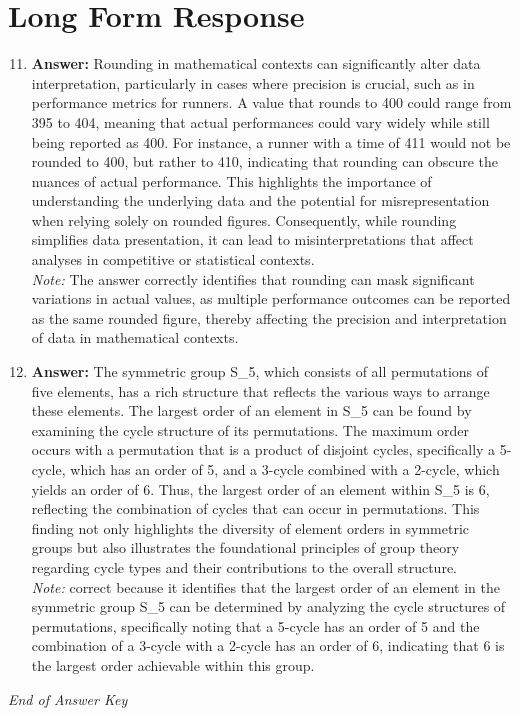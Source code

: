 \documentclass[12pt]{article}
\begin{document}
\section*{Long Form Response}
\begin{enumerate}[label=\arabic*.]
\setcounter{enumi}{10}
\item \textbf{Answer:} Rounding in mathematical contexts can significantly alter data interpretation, particularly in cases where precision is crucial, such as in performance metrics for runners. A value that rounds to 400 could range from 395 to 404, meaning that actual performances could vary widely while still being reported as 400. For instance, a runner with a time of 411 would not be rounded to 400, but rather to 410, indicating that rounding can obscure the nuances of actual performance. This highlights the importance of understanding the underlying data and the potential for misrepresentation when relying solely on rounded figures. Consequently, while rounding simplifies data presentation, it can lead to misinterpretations that affect analyses in competitive or statistical contexts.
\\ \textit{Note:} The answer correctly identifies that rounding can mask significant variations in actual values, as multiple performance outcomes can be reported as the same rounded figure, thereby affecting the precision and interpretation of data in mathematical contexts.
\item \textbf{Answer:} The symmetric group S\_5, which consists of all permutations of five elements, has a rich structure that reflects the various ways to arrange these elements. The largest order of an element in S\_5 can be found by examining the cycle structure of its permutations. The maximum order occurs with a permutation that is a product of disjoint cycles, specifically a 5-cycle, which has an order of 5, and a 3-cycle combined with a 2-cycle, which yields an order of 6. Thus, the largest order of an element within S\_5 is 6, reflecting the combination of cycles that can occur in permutations. This finding not only highlights the diversity of element orders in symmetric groups but also illustrates the foundational principles of group theory regarding cycle types and their contributions to the overall structure.
\\ \textit{Note:} correct because it identifies that the largest order of an element in the symmetric group S\_5 can be determined by analyzing the cycle structures of permutations, specifically noting that a 5-cycle has an order of 5 and the combination of a 3-cycle with a 2-cycle has an order of 6, indicating that 6 is the largest order achievable within this group.
\end{enumerate}

\vfill
\noindent\textit{End of Answer Key}
\end{document}
